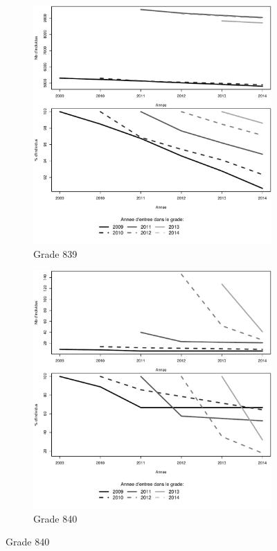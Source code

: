 \documentclass[11pt,a4paper]{article}
\begin{document}
\begin{figure}[ht] 
  \caption{Survie dans le grade: Aides soignants}
  \label{surv_by_entry_AS} 
  \begin{subfigure}[b]{0.5\linewidth}
      \caption{Grade 839} 
    \label{echelon_by_neg_839} 
    \centering
    \includegraphics[width=1\linewidth]{AS_survival_839.pdf} 
  \end{subfigure}%
  \begin{subfigure}[b]{0.5\linewidth}
        \caption{Grade 840} 
    \label{echelon_by_neg_840} 
    \centering
    \includegraphics[width=1\linewidth]{AS_survival_840.pdf} 
  \end{subfigure} 
\end{figure}
\end{document}
